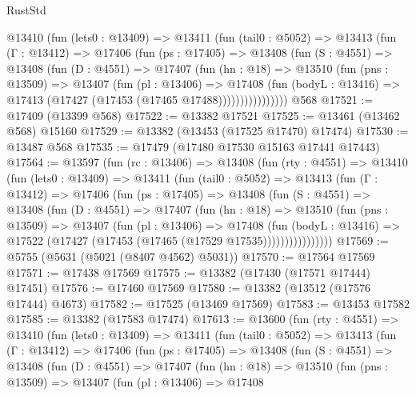\begin{lexlean}{RustStd}
\begin{coremodule}
        @13410
          (fun (lets0 : @13409) =>
          @13411
            (fun (tail0 : @5052) =>
            @13413
              (fun (Γ : @13412) =>
              @17406
                (fun (ps : @17405) =>
                @13408
                  (fun (S : @4551) =>
                  @13408
                    (fun (D : @4551) =>
                    @17407
                      (fun (hn : @18) =>
                      @13510
                        (fun (pns : @13509) =>
                        @13407
                          (fun (pl : @13406) =>
                          @17408
                            (fun (bodyL : @13416) =>
                            @17413 (@17427 (@17453 (@17465 @17488))))))))))))))))
    @568
@17521 := @17409 (@13399 @568)
@17522 := @13382 @17521
@17525 := @13461 (@13462 @568) @15160
@17529 := @13382 (@13453 (@17525 @17470) @17474)
@17530 := @13487 @568
@17535 := @17479 (@17480 @17530 @15163 @17441 @17443)
@17564 := @13597
    (fun (rc : @13406) =>
    @13408
      (fun (rty : @4551) =>
      @13410
        (fun (lets0 : @13409) =>
        @13411
          (fun (tail0 : @5052) =>
          @13413
            (fun (Γ : @13412) =>
            @17406
              (fun (ps : @17405) =>
              @13408
                (fun (S : @4551) =>
                @13408
                  (fun (D : @4551) =>
                  @17407
                    (fun (hn : @18) =>
                    @13510
                      (fun (pns : @13509) =>
                      @13407
                        (fun (pl : @13406) =>
                        @17408
                          (fun (bodyL : @13416) =>
                          @17522 (@17427 (@17453 (@17465 (@17529 @17535))))))))))))))))
@17569 := @5755 (@5631 (@5021 (@8407 @4562) @5031))
@17570 := @17564 @17569
@17571 := @17438 @17569
@17575 := @13382 (@17430 (@17571 @17444) @17451)
@17576 := @17460 @17569
@17580 := @13382 (@13512 (@17576 @17444) @4673)
@17582 := @17525 (@13469 @17569)
@17583 := @13453 @17582
@17585 := @13382 (@17583 @17474)
@17613 := @13600
    (fun (rty : @4551) =>
    @13410
      (fun (lets0 : @13409) =>
      @13411
        (fun (tail0 : @5052) =>
        @13413
          (fun (Γ : @13412) =>
          @17406
            (fun (ps : @17405) =>
            @13408
              (fun (S : @4551) =>
              @13408
                (fun (D : @4551) =>
                @17407
                  (fun (hn : @18) =>
                  @13510
                    (fun (pns : @13509) =>
                    @13407
                      (fun (pl : @13406) =>
                      @17408

\end{coremodule}
\end{lexlean}

